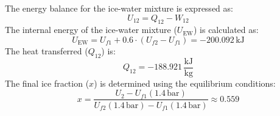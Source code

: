 The energy balance for the ice-water mixture is expressed as:  
\[
U_{12} = Q_{12} - W_{12}
\]  
The internal energy of the ice-water mixture (\( U_{\text{EW}} \)) is calculated as:  
\[
U_{\text{EW}} = U_{f1} + 0.6 \cdot (U_{f2} - U_{f1}) = -200.092 \, \text{kJ}
\]  
The heat transferred (\( Q_{12} \)) is:  
\[
Q_{12} = -188.921 \, \frac{\text{kJ}}{\text{kg}}
\]  
The final ice fraction (\( x \)) is determined using the equilibrium conditions:  
\[
x = \frac{U_2 - U_{f1} (1.4 \, \text{bar})}{U_{f2} (1.4 \, \text{bar}) - U_{f1} (1.4 \, \text{bar})} \approx 0.559
\]